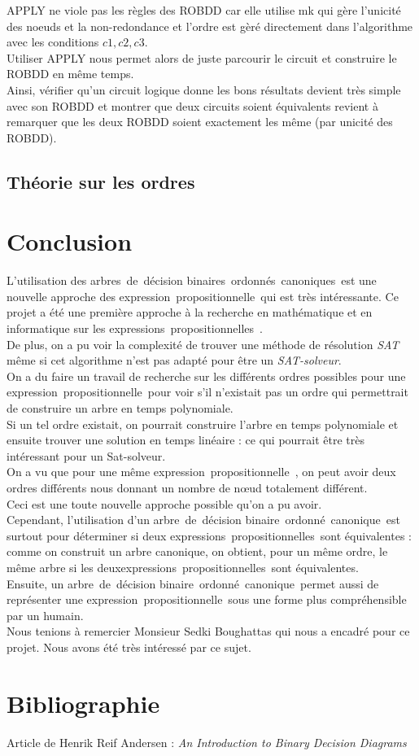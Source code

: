 \documentclass[a4paper, oneside]{report}
\newcommand{\adb}{arbre~de~décision binaire~}
\newcommand{\adbs}{arbres~de~décision binaires~}
\newcommand{\adbo}{\adb ordonné~}
\newcommand{\adbos}{\adbs ordonnés~}
\newcommand{\adboc}{\adbo canonique~}
\newcommand{\adbocs}{\adbos canoniques~}
\newcommand{\expp}{expression~propositionnelle~}
\newcommand{\expps}{expressions~propositionnelles~}
\begin{document}
APPLY ne viole pas les règles des ROBDD car elle utilise mk qui gère l'unicité des noeuds et la non-redondance et l'ordre est gèré directement dans l'algorithme avec les conditions $c1, c2, c3$.\\

Utiliser APPLY nous permet alors de juste parcourir le circuit et construire le ROBDD en même temps.\\


Ainsi, vérifier qu'un circuit logique donne les bons résultats devient très simple avec son ROBDD et montrer que deux circuits soient équivalents revient à remarquer que les deux ROBDD soient exactement les même (par unicité des ROBDD).


\newpage

\section{Théorie sur les ordres}


\chapter*{Conclusion}
L'utilisation des \adbocs est une nouvelle approche des \expp qui est très intéressante. Ce projet a été une première approche à la recherche en mathématique et en informatique sur les \expps.\\
De plus, on a pu voir la complexité de trouver une méthode de résolution \textit{SAT} même si cet algorithme n'est pas adapté pour être un \textit{SAT-solveur}.\\
On a du faire un travail de recherche sur les différents ordres possibles pour une \expp pour voir s'il n'existait pas un ordre qui permettrait de construire un arbre en temps polynomiale.\\
Si un tel ordre existait, on pourrait construire l'arbre en temps polynomiale et ensuite trouver une solution en temps linéaire : ce qui pourrait être très intéressant pour un Sat-solveur.\\
On a vu que pour une même \expp, on peut avoir deux ordres différents nous donnant un nombre de nœud totalement différent.\\
Ceci est une toute nouvelle approche possible qu'on a pu avoir.\\
Cependant, l'utilisation d'un \adboc est surtout pour déterminer si deux \expps sont équivalentes : comme on construit un arbre canonique, on obtient, pour un même ordre, le même arbre si les deux\expps sont équivalentes.\\
Ensuite, un \adboc permet aussi de représenter une \expp sous une forme plus compréhensible par un humain.\\
Nous tenions à remercier Monsieur Sedki Boughattas qui nous a encadré pour ce projet. Nous avons été très intéressé par ce sujet.
\chapter*{Bibliographie}
Article de Henrik Reif Andersen : \textit{An Introduction to Binary Decision Diagrams}
\end{document}
